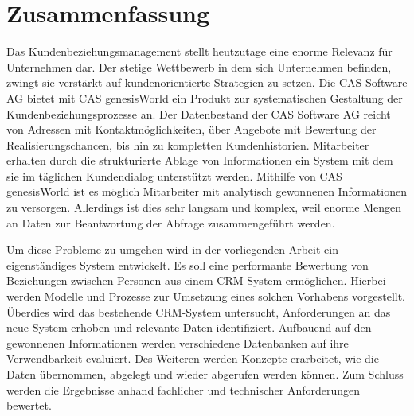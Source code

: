 
\chapter*{\centering Zusammenfassung}



Das Kundenbeziehungsmanagement stellt heutzutage eine enorme Relevanz für Unternehmen dar. Der stetige Wettbewerb in dem sich Unternehmen
befinden, zwingt sie verstärkt auf kundenorientierte Strategien zu setzen. Die CAS Software AG bietet mit CAS genesisWorld ein Produkt zur systematischen Gestaltung der Kundenbeziehungsprozesse an. Der Datenbestand der CAS Software AG reicht von Adressen mit Kontaktmöglichkeiten, über Angebote mit Bewertung der Realisierungschancen, bis hin zu kompletten Kundenhistorien. Mitarbeiter erhalten durch die strukturierte Ablage von Informationen ein System mit dem sie im täglichen Kundendialog unterstützt werden. Mithilfe von CAS genesisWorld ist es möglich Mitarbeiter mit analytisch gewonnenen Informationen zu versorgen. Allerdings ist dies sehr langsam und komplex, weil enorme Mengen an Daten zur Beantwortung der Abfrage zusammengeführt werden.       

Um diese Probleme zu umgehen wird in der vorliegenden Arbeit ein eigenständiges System entwickelt. Es soll eine performante Bewertung von Beziehungen zwischen Personen aus einem CRM-System ermöglichen. Hierbei werden Modelle und Prozesse zur Umsetzung eines solchen Vorhabens vorgestellt. Überdies wird das bestehende CRM-System untersucht, Anforderungen an das neue System erhoben und relevante Daten identifiziert. Aufbauend auf den gewonnenen Informationen werden verschiedene Datenbanken auf ihre Verwendbarkeit evaluiert. Des Weiteren werden Konzepte erarbeitet, wie die Daten übernommen, abgelegt und wieder abgerufen werden können. Zum Schluss werden die Ergebnisse anhand fachlicher und technischer Anforderungen bewertet.